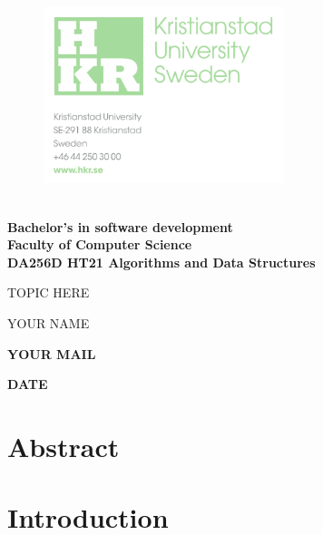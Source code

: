 \documentclass{article}
\begin{document}
	
	\begin{figure}[h!]

			\includegraphics[width=7cm]{images/hkr.png}
			\label{title}
	   \endminipage
		\endminipage
	\end{figure}
	
	\vspace{0.8cm}
	\Large

	\textbf{\\
	Bachelor’s in software development\\
	Faculty of Computer Science\\
	DA256D HT21 Algorithms and Data Structures}
	\begin{center}
	\vspace{3cm}
	\Huge
	
	TOPIC HERE
	
	\vspace{2cm}
	\LARGE
	YOUR NAME
	
	\vspace{0.4cm}	
	\large
	\textbf{YOUR MAIL}		\vspace{0.9cm}	

    \textbf{DATE}
	\end{center}
	
\thispagestyle{empty}       %

\newpage
	





\tableofcontents
\large

\thispagestyle{empty}        %


\newpage 

\section*{Abstract}
\thispagestyle{empty}        %

\newpage
\section{Introduction}
\vspace{1cm}
\end{document}
